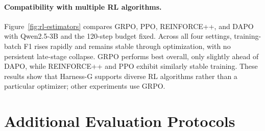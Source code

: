 \documentclass[letterpaper]{article} %
\begin{document}
\paragraph{Compatibility with multiple RL algorithms.}
Figure~\ref{fig:rl-estimators} compares GRPO, PPO, REINFORCE++, and DAPO \citep{schulman2017ppo,hu2025reinforcepp,shao2024deepseekmath,yu2025dapo} with Qwen2.5-3B and the 120-step budget fixed.
Across all four settings, training-batch F1 rises rapidly and remains stable through optimization, with no persistent late-stage collapse.
GRPO performs best overall, only slightly ahead of DAPO, while REINFORCE++ and PPO exhibit similarly stable training.
These results show that Harness-G supports diverse RL algorithms rather than a particular optimizer; other experiments use GRPO.

\section{Additional Evaluation Protocols}
\label{app:protocols}
\end{document}
